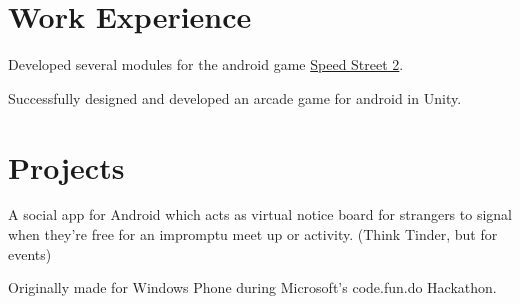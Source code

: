 \documentclass[a4paper]{resume}
\begin{document}
\begin{minipage}[t]{0.66\textwidth} %


\section{Work Experience}


\vspace{\topsep} %
\begin{tightitemize}
\item Developed several modules for the android game {\href{https://play.google.com/store/apps/details?id=com.firexit.speedstreet2VRdemo}{Speed Street 2}}.
\item Successfully designed and developed an arcade game for android in Unity.
\end{tightitemize}

\sectionspace %


\section{Projects}




\begin{tightitemize}
\item A social app for Android which acts as virtual notice board for strangers to signal when
they’re free for an impromptu meet up or activity. (Think Tinder, but for events)
\item Originally made for Windows Phone during Microsoft’s code.fun.do Hackathon.
\end{tightitemize}

\sectionspace %




\end{minipage}
\end{document}
